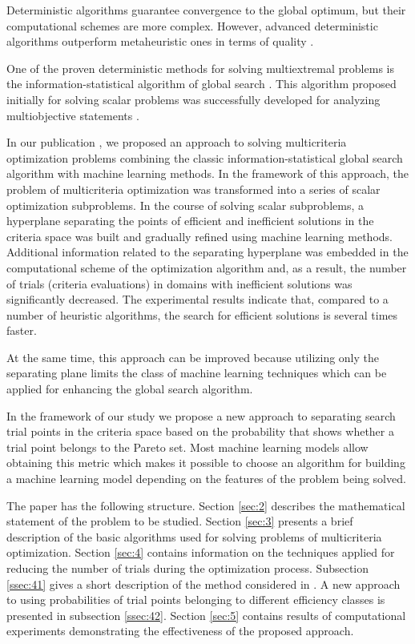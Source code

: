 \documentclass[runningheads]{llncs}
\begin{document}
Deterministic algorithms guarantee convergence to the global optimum, but their computational schemes are more complex. However, advanced deterministic algorithms outperform metaheuristic ones in terms of quality \cite{Kvasov2018,Sergeyev2018}.

One of the proven deterministic methods for solving multiextremal problems is the information-statistical algorithm of global search \cite{Strongin2000,Sergeyev2013}. This algorithm proposed initially for solving scalar problems was successfully developed for analyzing multiobjective statements \cite{ML_MCO_2023,Gergel2018,GergelKozinov2020}.

In our publication \cite{ML_MCO_2023}, we proposed an approach to solving multicriteria optimization problems combining the classic information-statistical global search algorithm with machine learning methods. In the framework of this approach, the problem of multicriteria optimization was transformed into a series of scalar optimization subproblems. In the course of solving scalar subproblems, a hyperplane separating the points of efficient and inefficient solutions in the criteria space was built and gradually refined using machine learning methods.  Additional information related to the separating hyperplane was embedded in the computational scheme of the optimization algorithm and, as a result, the number of trials (criteria evaluations) in domains with inefficient solutions was significantly decreased. The experimental results indicate that, compared to a number of heuristic algorithms, the search for efficient solutions is several times faster.

At the same time, this approach can be improved because utilizing only the separating plane limits the class of machine learning techniques which can be applied for enhancing the global search algorithm.

In the framework of our study we propose a new approach to separating search trial points in the criteria space based on the probability that shows whether a trial point belongs to the Pareto set. Most machine learning models allow obtaining this metric which makes it possible to choose an algorithm for building a machine learning model depending on the features of the problem being solved.

The paper has the following structure. Section \ref{sec:2} describes the mathematical statement of the problem to be studied. Section \ref{sec:3} presents a brief description of the basic algorithms used for solving problems of multicriteria optimization. Section \ref{sec:4} contains information on the techniques applied for reducing the number of trials during the optimization process. Subsection \ref{ssec:41} gives a short description of the method considered in \cite{ML_MCO_2023}. A new approach to using probabilities of trial points belonging to different efficiency classes is presented in subsection \ref{ssec:42}. Section \ref{sec:5} contains results of computational experiments demonstrating the effectiveness of the proposed approach.
\end{document}
